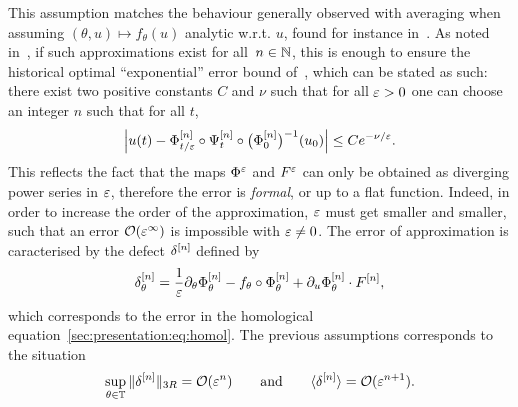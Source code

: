 This assumption matches the behaviour generally observed with averaging
when assuming $(\theta,u) \mapsto f_\theta(u)$ analytic w.r.t. $u$,
found for instance in~\cite{castella.2015.stroboscopic}. As noted
in~\cite{chartier.2015.higher}, if such approximations exist for all~$n
\in \mathbb{N}$, this is enough to ensure the historical optimal
``exponential'' error bound of~\cite{neishtadt.1984.separation}, which
can be stated as such: there exist two positive constants $C$ and $\nu$
such that for all $\varepsilon > 0$ one can choose an integer $n$ such that for
all $t$,
\begin{equation*}
  \left| u(t) - \Phi^{[n]} _{t/\varepsilon} \circ \Psi^{[n]}_t 
  \circ \big( \Phi^{[n]} _0 \big)^{-1} (u_0) \right| 
  \leq C e^{-\nu/\varepsilon} .
\end{equation*}
This reflects the fact that the maps $\Phi^\varepsilon$ and $F^\varepsilon$ can only
be obtained as diverging power series in $\varepsilon$, therefore the error is
\textit{formal}, or up to a flat function. Indeed, in order to increase
the order of the approximation, $\varepsilon$ must get smaller and smaller,
such that an error $\mathcal{O}( \varepsilon^\infty )$ is impossible with $\varepsilon \neq
0$. The error of approximation is caracterised by the defect $\delta^{[n]}$ defined by
\begin{equation*} 
  \delta^{[n]} _{\theta} 
  = \frac{1}{\varepsilon} \partial_\theta \Phi^{[n]} _\theta
    - f_\theta \circ \Phi^{[n]} _\theta 
    + \partial_u \Phi^{[n]} _\theta \cdot F^{[n]} , 
\end{equation*}
which corresponds to the error in the homological
equation~\eqref{sec:presentation:eq:homol}. The previous assumptions
corresponds to the situation
\begin{equation} \label{sec:approx:hyp:delta}
  \sup_{\theta \in \mathbb{T}} \| \delta^{[n]} \| _{3R} = \mathcal{O}( \varepsilon^n )
  \qquad\text{and}\qquad
  \langle \delta^{[n]} \rangle = \mathcal{O}( \varepsilon^{n+1} ) .
\end{equation}
%

